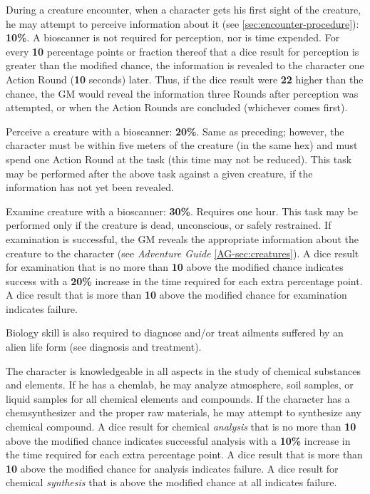 \begin{tasklist}
\item During a creature encounter, when a character gets his first
  sight of the creature, he may attempt to perceive information about
  it (see \ref{sec:encounter-procedure}): \textbf{10\%}.  A bioscanner
  is not required for perception, nor is time expended.  For every
  \textbf{10} percentage points or fraction thereof that a dice result
  for perception is greater than the modified chance, the information
  is revealed to the character one Action Round (\textbf{10} seconds)
  later.  Thus, if the dice result were \textbf{22} higher than the
  chance, the GM would reveal the information three Rounds after
  perception was attempted, or when the Action Rounds are concluded
  (whichever comes first).
\item Perceive a creature with a bioscanner: \textbf{20\%}.  Same as
  preceding; however, the character must be within five meters of the
  creature (in the same hex) and must spend one Action Round at the
  task (this time may not be reduced).  This task may be performed
  after the above task against a given creature, if the information
  has not yet been revealed.
\item Examine creature with a bioscanner: \textbf{30\%}.  Requires one
  hour.  This task may be performed only if the creature is dead,
  unconscious, or safely restrained.  If examination is successful,
  the GM reveals the appropriate information about the creature to the
  character (see \emph{Adventure Guide} \ref{AG-sec:creatures}).  A
  dice result for examination that is no more than \textbf{10} above
  the modified chance indicates success with a \textbf{20\%} increase
  in the time required for each extra percentage point.  A dice result
  that is more than \textbf{10} above the modified chance for
  examination indicates failure.
\end{tasklist}

Biology skill is also required to diagnose and/or treat ailments
suffered by an alien life form (see diagnosis and treatment).

\label{sec:skill-chemistry}

The character is knowledgeable in all aspects in the study of chemical
substances and elements.  If he has a chemlab, he may analyze
atmosphere, soil samples, or liquid samples for all chemical elements
and compounds.  If the character has a chemsynthesizer and the proper
raw materials, he may attempt to synthesize any chemical compound.  A
dice result for chemical \emph{analysis} that is no more than
\textbf{10} above the modified chance indicates successful analysis
with a \textbf{10\%} increase in the time required for each extra
percentage point.  A dice result that is more than \textbf{10} above
the modified chance for analysis indicates failure.  A dice result for
chemical \emph{synthesis} that is above the modified chance at all
indicates failure.

